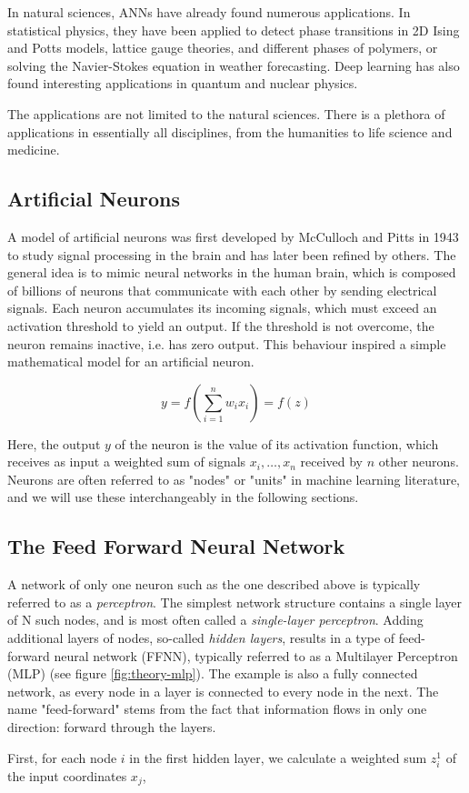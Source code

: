 In natural sciences, ANNs have already found numerous applications.
In statistical physics, they have been applied to detect
phase transitions in 2D Ising and Potts models, lattice gauge
theories, and different phases of polymers, or solving the
Navier-Stokes equation in weather forecasting.  Deep learning has also
found interesting applications in quantum and nuclear physics.

The applications are not limited to the natural sciences. There is a
plethora of applications in essentially all disciplines, from the
humanities to life science and medicine.

\subsection{Artificial Neurons}
A model of artificial neurons was first developed by McCulloch and Pitts in 1943 
\cite{McCulloch1943} to study signal
processing in the brain and has later been refined by others. The
general idea is to mimic neural networks in the human brain, which is
composed of billions of neurons that communicate with each other by
sending electrical signals.  Each neuron accumulates its incoming
signals, which must exceed an activation threshold to yield an
output. If the threshold is not overcome, the neuron remains inactive,
i.e. has zero output. This behaviour inspired a simple mathematical model for an artificial neuron.

\begin{equation}\label{eq:artificial-neuron}
 y = f\left(\sum_{i=1}^n w_ix_i\right) = f(z)
\end{equation}

Here, the output $y$ of the neuron is the value of its activation function,
which receives as input a weighted sum of signals $x_i, \dots ,x_n$ received by $n$ other neurons.
Neurons are often referred to as "nodes" or "units" in machine learning literature,
and we will use these interchangeably in the following sections.

\subsection{The Feed Forward Neural Network}
A network of only one neuron such as the one described above is typically referred
to as a \textit{perceptron}. The simplest network structure contains a
single layer of N such nodes, and is most often called a \textit{single-layer perceptron}.
Adding additional layers of nodes, so-called \textit{hidden layers}, results in a
type of feed-forward neural network (FFNN), typically referred to as a Multilayer Perceptron (MLP)
(see figure \ref{fig:theory-mlp}). The example is also a fully connected network, as every
node in a layer is connected to every node in the next. The name "feed-forward" stems from
the fact that information flows in only one direction: forward through the layers.

First, for each node $i$ in the first hidden layer, we calculate a weighted sum $z_i^1$ of the input coordinates $x_j$,

